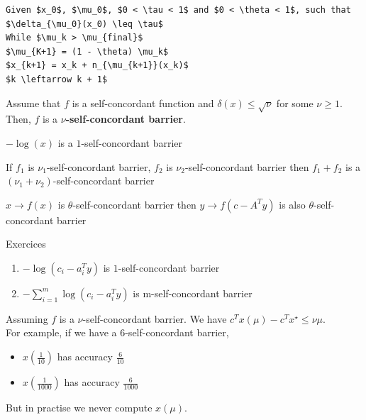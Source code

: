 \begin{lstlisting}[mathescape,caption=Interior Point Algorithm]
Given $x_0$, $\mu_0$, $0 < \tau < 1$ and $0 < \theta < 1$, such that $\delta_{\mu_0}(x_0) \leq \tau$
While $\mu_k > \mu_{final}$
$\mu_{K+1} = (1 - \theta) \mu_k$ 
$x_{k+1} = x_k + n_{\mu_{k+1}}(x_k)$
$k \leftarrow k + 1$
\end{lstlisting}


\begin{definition} Assume that $f$ is a self-concordant function and $\delta (x) \leq \sqrt{\nu}$ for some $\nu \geq 1$. Then, $f$ is a \textbf{$\nu$-self-concordant barrier}.
\end{definition}

\begin{example}
\begin{leftbar}
$- \log (x)$ is a $1$-self-concordant barrier 
\end{leftbar}
\end{example}

\begin{property}
If $f_1$ is $\nu_1$-self-concordant barrier, $f_2$ is $\nu_2$-self-concordant barrier then $f_1 + f_2$ is a $(\nu_1 + \nu_2)$-self-concordant barrier
\end{property}
 
\begin{property}
$x \rightarrow f(x)$ is $\theta$-self-concordant barrier then $y \rightarrow f(c - A^T y)$ is also $\theta$-self-concordant barrier
\end{property}

\begin{example}
\begin{leftbar}
Exercices 
\begin{enumerate}
\item $- \log (c_i - a_i^T y)$ is $1$-self-concordant barrier
\item $- \sum_{i=1}^m \log (c_i - a_i^T y)$ is m-self-concordant barrier
\end{enumerate}
\end{leftbar}
\end{example}

Assuming $f$ is a $\nu$-self-concordant barrier. We have $c^T x(\mu) - c^T x^{\star} \leq \nu\mu$.\\
For example, if we have a 6-self-concordant barrier,
\begin{itemize}
\item $x(\frac{1}{10})$ has accuracy $\frac{6}{10}$
\item $x(\frac{1}{1000})$ has accuracy $\frac{6}{1000}$
\end{itemize}
But in practise we never compute $x(\mu)$.\\

